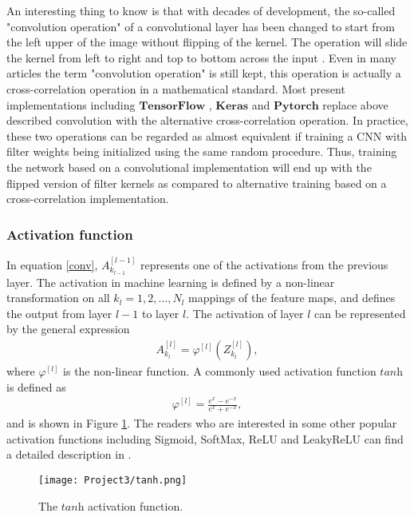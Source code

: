 \documentclass[a4paper]{article}
\begin{document}
An interesting thing to know is that with decades of development, the so-called "convolution operation" of a convolutional layer has been changed to start from the left upper of the image without flipping of the kernel. The operation will slide the kernel from left to right and top to bottom across the input \cite{MLbrain}. Even in many articles the term "convolution operation" is still kept, this operation is actually a cross-correlation operation in a mathematical standard. Most present implementations including $\mathbf{TensorFlow}$ \cite{Tensorflow}, $\mathbf{Keras}$ \cite{Keras} and $\mathbf{Pytorch}$ \cite{pytorch} replace above described convolution with the alternative cross-correlation operation. In practice, these two operations can be regarded as almost equivalent if training a CNN with filter weights being initialized using the same random procedure. Thus, training the network based on a convolutional implementation will end up with the flipped version of filter kernels as compared to alternative training based on a cross-correlation implementation. 

\subsubsection{Activation function}

In equation \ref{conv}, $A_{k_{l-1}}^{[l-1]}$ represents one of the activations from the previous layer. The activation in machine learning is defined by a non-linear transformation on all $k_{l}=1,2,...,N_{l}$ mappings of the feature maps, and defines the output from layer $l-1$ to layer $l$. The activation of layer $l$ can be represented by the general expression
\begin{align}
    A_{k_{l}}^{[l]}=\varphi^{[l]}(Z_{k_{l}}^{[l]}),
    \label{activation}
\end{align}
where $\varphi^{[l]}$ is the non-linear function. A commonly used activation function $\textit{tanh}$ is defined as
\begin{align}
    \varphi^{[l]} 
    =\frac {e^{x}-e^{-x}} {e^{x}+e^{-x}},
\end{align}
and is shown in Figure \ref{tanh}. The readers who are interested in some other popular activation functions including Sigmoid, SoftMax, ReLU and LeakyReLU can find a detailed description in \cite{project2}.

\begin{figure}[H]
  \centering
  \texttt{[image: Project3/tanh.png]}
  \caption{The $\textit{tanh}$ activation function.}
    \label{tanh}
\end{figure}
\end{document}
